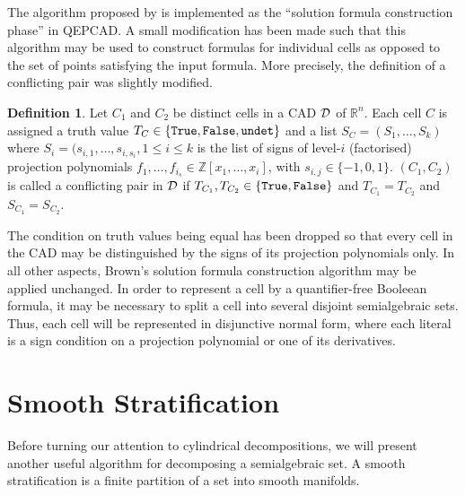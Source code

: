 \documentclass[
]{book}
\theoremstyle{definition}
\newtheorem{definition}{Definition}[chapter]
\theoremstyle{definition}
\theoremstyle{definition}
\theoremstyle{definition}
\theoremstyle{remark}
\begin{document}
The algorithm proposed by \citet{brown99} is implemented as the ``solution formula construction phase'' in QEPCAD. A small modification has been made such that this algorithm may be used to construct formulas for individual cells as opposed to the set of points satisfying the input formula. More precisely, the definition of a conflicting pair was slightly modified.

\begin{definition}
Let \(C_1\) and \(C_2\) be distinct cells in a CAD \(\cal D\) of \(\mathbb{R}^n\). Each cell \(C\) is assigned a truth value \(T_C \in \{\tt{True}, \tt{False}, \tt{undet}\}\) and a list \(S_C = (S_1,\ldots,S_k)\) where \(S_i = (s_{i,1},\ldots,s_{i,s_i}, 1\le i \le k\) is the list of signs of level-\(i\) (factorised) projection polynomials \(f_1,\ldots,f_{i_s} \in \mathbb{Z}[x_1,\ldots,x_i]\), with \(s_{i,j} \in \{-1,0,1\}\).
\((C_1, C_2)\) is called a conflicting pair in \(\cal D\) if \(T_{C_1}, T_{C_2} \in \{\tt{True}, \tt{False}\}\) and \(T_{C_1} = T_{C_2}\) and \(S_{C_1} = S_{C_2}\).
\end{definition}

The condition on truth values being equal has been dropped so that every cell in the CAD may be distinguished by the signs of its projection polynomials only. In all other aspects, Brown's solution formula construction algorithm may be applied unchanged. In order to represent a cell by a quantifier-free Booleean formula, it may be necessary to split a cell into several disjoint semialgebraic sets. Thus, each cell will be represented in disjunctive normal form, where each literal is a sign condition on a projection polynomial or one of its derivatives.

\hypertarget{sec:smooth-strat}{%
\chapter{Smooth Stratification}\label{sec:smooth-strat}}

Before turning our attention to cylindrical decompositions, we will present another useful algorithm for decomposing a semialgebraic set. A smooth stratification is a finite partition of a set into smooth manifolds.
\end{document}
